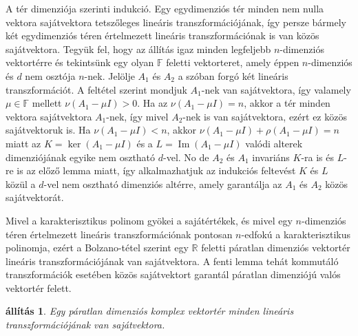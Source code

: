 \documentclass[a4paper, showtrims]{memoir}
\makeatletter
\renewenvironment{proof}[1][\proofname]
    {\par\pushQED{\qed}%
    \normalfont \topsep6\p@\@plus6\p@\relax
    \trivlist
    \item[\hskip\labelsep
        \itshape
    #1\@addpunct{:}]\ignorespaces}
    {\popQED\endtrivlist\@endpefalse}
\theoremstyle{plain}
\newtheorem{proposition}{állítás}[chapter]
\theoremstyle{remark}
\theoremstyle{definition}
\DeclareMathOperator{\im}{Im}
\makeatother
\begin{document}
\begin{proof}
	A tér dimenziója szerinti indukció.
	Egy egydimenziós tér minden nem nulla vektora sajátvektora tetszőleges lineáris transzformációjának,
	így persze bármely két egydimenziós téren értelmezett lineáris transzformációnak is van közös
	sajátvektora.
	Tegyük fel,
	hogy az állítás igaz minden legfeljebb $n$-dimenziós vektortérre
	és tekintsünk egy olyan $\mathbb{F}$ feletti vektorteret,
	amely éppen $n$-dimenziós és $d$ nem osztója $n$-nek.
	Jelölje $A_1$ és $A_2$ a szóban forgó két lineáris transzformációt.
	A feltétel szerint mondjuk $A_1$-nek van sajátvektora,
	így valamely $\mu\in\mathbb{F}$ mellett
	$\nu\left( A_1-\mu I \right)>0.$
	Ha az
	$\nu\left( A_1-\mu I \right)=n$, akkor a tér minden vektora sajátvektora $A_1$-nek,
	így mivel $A_2$-nek is van sajátvektora, ezért ez közös sajátvektoruk is.
	Ha
	$\nu\left( A_1-\mu I \right)<n$, akkor
	$\nu\left( A_1-\mu I \right)+\rho\left( A_1-\mu I \right)=n$ miatt az
	$K=\ker\left( A_1-\mu I \right)$ és a
	$L=\im\left( A_1-\mu I \right)$
	valódi alterek dimenziójának egyike nem osztható $d$-vel.
	No de $A_2$ és $A_1$ invariáns $K$-ra is és $L$-re is
	az előző lemma miatt,
	így alkalmazhatjuk az indukciós feltevést $K$ és $L$ közül
	a $d$-vel nem osztható dimenziós altérre,
	amely garantálja az $A_1$ és $A_2$ közös sajátvektorát.
\end{proof}

Mivel a karakterisztikus polinom gyökei a sajátértékek, és mivel egy $n$-dimenziós
téren értelmezett lineáris transzformációnak pontosan $n$-edfokú a karakterisztikus polinomja,
ezért a Bolzano-tétel szerint egy $\mathbb{R}$ feletti páratlan dimenziós vektortér lineáris transzformációjának van sajátvektora.
A fenti lemma tehát kommutáló transzformációk esetében közös sajátvektort garantál
páratlan dimenziójú valós vektortér felett.

\begin{proposition}
	Egy páratlan dimenziós komplex vektortér
	minden lineáris transzformációjának van sajátvektora.
\end{proposition}
\end{document}
